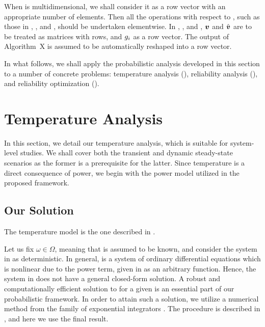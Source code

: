 \begin{remark}
When \g is multidimensional, we shall consider it as a row vector with an
appropriate number of elements. Then all the operations with respect to \g, such
as those in , , and
, should be undertaken elementwise. In
, , and
, $\boldsymbol{v}$ and $\hat{\boldsymbol{v}}$ are to be treated as
matrices with \nc rows, and $g_i$ as a row vector. The output of Algorithm~X is
assumed to be automatically reshaped into a row vector.
\end{remark}

In what follows, we shall apply the probabilistic analysis developed in this
section to a number of concrete problems: temperature analysis
(), reliability analysis
(), and reliability optimization
().

\section{Temperature Analysis}

In this section, we detail our temperature analysis, which is suitable for
system-level studies. We shall cover both the transient and dynamic steady-state
scenarios as the former is a prerequisite for the latter. Since temperature is a
direct consequence of power, we begin with the power model utilized in the
proposed framework.

\subsection{Our Solution}

The temperature model is the one described in .

Let us fix $\omega \in \Omega$, meaning that \vu is assumed to be known, and
consider the system in  as deterministic. In general,
 is a system of ordinary differential equations which
is nonlinear due to the power term, given in  as an arbitrary
function. Hence, the system in  does not have a general
closed-form solution. A robust and computationally efficient solution to
 for a given \vu is an essential part of our probabilistic
framework. In order to attain such a solution, we utilize a numerical method
from the family of exponential integrators \cite{hochbruck2010}. The procedure
is described in , and here we use the final result.

